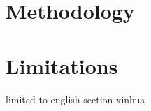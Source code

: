 \section{Methodology}\label{sec:methodology}

\section{Limitations}\label{sec:limits}

limited to english section xinhua

